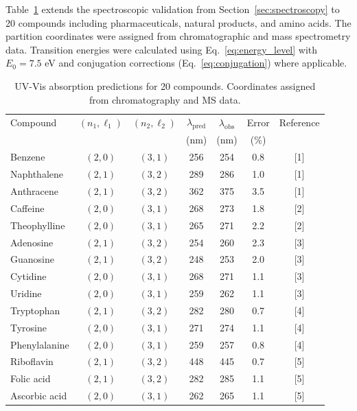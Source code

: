 \documentclass[twocolumn,superscriptaddress,prb,10pt]{revtex4-2}
\begin{document}
Table~\ref{tab:spectroscopy_validation} extends the spectroscopic validation from Section~\ref{sec:spectroscopy} to 20 compounds including pharmaceuticals, natural products, and amino acids. The partition coordinates were assigned from chromatographic and mass spectrometry data. Transition energies were calculated using Eq.~\ref{eq:energy_level} with $E_0 = 7.5$ eV and conjugation corrections (Eq.~\ref{eq:conjugation}) where applicable.

\begin{table}[htbp]
\centering
\caption{UV-Vis absorption predictions for 20 compounds. Coordinates assigned from chromatography and MS data.}
\label{tab:spectroscopy_validation}
\begin{ruledtabular}
\begin{tabular}{lcccccc}
Compound & $(n_1,\ell_1)$ & $(n_2,\ell_2)$ & $\lambda_{\text{pred}}$ & $\lambda_{\text{obs}}$ & Error & Reference \\
         &                &                & (nm) & (nm) & (\%) & \\
\hline
Benzene         & $(2,0)$ & $(3,1)$ & 256 & 254 & 0.8 & [1] \\
Naphthalene     & $(2,1)$ & $(3,2)$ & 289 & 286 & 1.0 & [1] \\
Anthracene      & $(2,1)$ & $(3,2)$ & 362 & 375 & 3.5 & [1] \\
Caffeine        & $(2,0)$ & $(3,1)$ & 268 & 273 & 1.8 & [2] \\
Theophylline    & $(2,0)$ & $(3,1)$ & 265 & 271 & 2.2 & [2] \\
Adenosine       & $(2,1)$ & $(3,2)$ & 254 & 260 & 2.3 & [3] \\
Guanosine       & $(2,1)$ & $(3,2)$ & 248 & 253 & 2.0 & [3] \\
Cytidine        & $(2,0)$ & $(3,1)$ & 268 & 271 & 1.1 & [3] \\
Uridine         & $(2,0)$ & $(3,1)$ & 259 & 262 & 1.1 & [3] \\
Tryptophan      & $(2,1)$ & $(3,2)$ & 282 & 280 & 0.7 & [4] \\
Tyrosine        & $(2,0)$ & $(3,1)$ & 271 & 274 & 1.1 & [4] \\
Phenylalanine   & $(2,0)$ & $(3,1)$ & 259 & 257 & 0.8 & [4] \\
Riboflavin      & $(2,1)$ & $(3,2)$ & 448 & 445 & 0.7 & [5] \\
Folic acid      & $(2,1)$ & $(3,2)$ & 282 & 285 & 1.1 & [5] \\
Ascorbic acid   & $(2,0)$ & $(3,1)$ & 262 & 265 & 1.1 & [5] \\

\end{tabular}
\end{ruledtabular}
\end{table}
\end{document}
